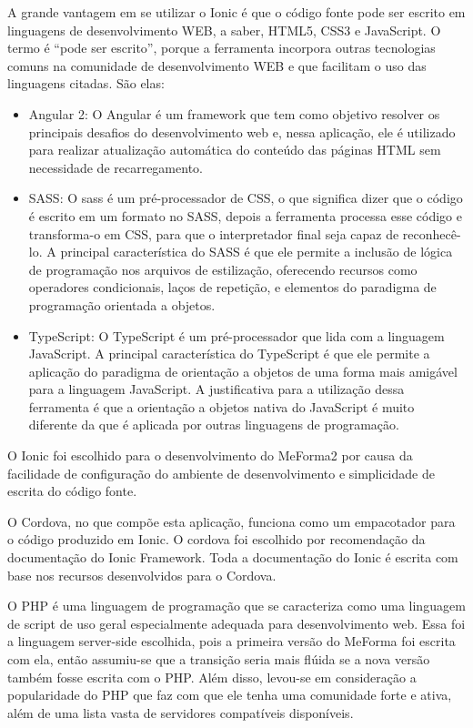 A grande vantagem em se utilizar o Ionic é que o código fonte pode ser escrito em linguagens de desenvolvimento WEB, a saber, HTML5, CSS3 e JavaScript. O termo é ``pode ser escrito'', porque a ferramenta incorpora outras tecnologias comuns na comunidade de desenvolvimento WEB e que facilitam o uso das linguagens citadas. São elas:
\begin{itemize}
\item Angular 2: O Angular é um framework que tem como objetivo resolver os principais desafios do desenvolvimento web e, nessa aplicação, ele é utilizado para realizar atualização automática do conteúdo das páginas HTML sem necessidade de recarregamento.
\item SASS: O sass é um pré-processador de CSS, o que significa dizer que o código é escrito em um formato no SASS, depois a ferramenta processa esse código e transforma-o em CSS, para que o interpretador final seja capaz de reconhecê-lo. A principal característica do SASS é que ele permite a inclusão de lógica de programação nos arquivos de estilização, oferecendo recursos como operadores condicionais, laços de repetição, e elementos do paradigma de programação orientada a objetos.
\item TypeScript: O TypeScript é um pré-processador que lida com a linguagem JavaScript. A principal característica do TypeScript é que ele permite a aplicação do paradigma de orientação a objetos de uma forma mais amigável para a linguagem JavaScript. A justificativa para a utilização dessa ferramenta é que a orientação a objetos nativa do JavaScript é muito diferente da que é aplicada por outras linguagens de programação.
\end{itemize}
O Ionic foi escolhido para o desenvolvimento do MeForma2 por causa da facilidade de configuração do ambiente de desenvolvimento e simplicidade de escrita do código fonte.

O Cordova, no que compõe esta aplicação, funciona como um empacotador para o código produzido em Ionic. O cordova foi escolhido por recomendação da documentação do Ionic Framework. Toda a documentação do Ionic é escrita com base nos recursos desenvolvidos para o Cordova.

O PHP é uma linguagem de programação que se caracteriza como uma linguagem de script de uso geral especialmente adequada para desenvolvimento web. Essa foi a linguagem server-side escolhida, pois a primeira versão do MeForma foi escrita com ela, então assumiu-se que a transição seria mais flúida se a nova versão também fosse escrita com o PHP. Além disso, levou-se em consideração a popularidade do PHP que faz com que ele tenha uma comunidade forte e ativa, além de uma lista vasta de servidores compatíveis disponíveis.

